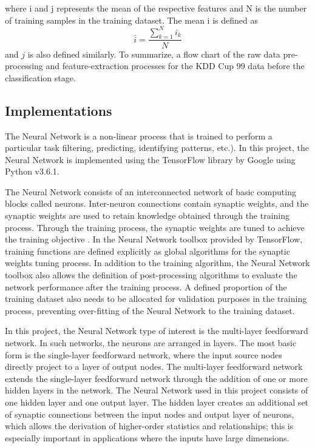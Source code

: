 \documentclass[12pt]{article}
\theoremstyle{definition}
\begin{document}
			where i and j represents the mean of the respective features and N is the number of training samples in the training dataset. The mean i is defined as
			\begin{equation}
				\bar{i} = \frac{\sum_{k=1}^{N}i_{k}}{N}
			\end{equation}
			and $j$ is also defined similarly. To summarize, a flow chart of the raw data pre-processing and feature-extraction processes for the KDD Cup 99 data before the classification stage.
			
		\subsection{Implementations}
			
			The Neural Network is a non-linear process that is trained to perform a particular task filtering, predicting, identifying patterns, etc.). In this project, the Neural Network is implemented using the TensorFlow library by Google using Python v3.6.1.
			
			
			The Neural Network consists of an interconnected network of basic computing blocks called
			neurons. Inter-neuron connections contain synaptic weights, and the synaptic weights are
			used to retain knowledge obtained through the training process. Through the training
			process, the synaptic weights are tuned to achieve the training objective \cite{Wang2010}. In the Neural Network
			toolbox provided by TensorFlow, training functions are defined explicitly as global
			algorithms for the synaptic weights tuning process. In addition to the training algorithm,
			the Neural Network toolbox also allows the definition of post-processing algorithms to evaluate the
			network performance after the training process. A defined proportion of the training
			dataset also needs to be allocated for validation purposes in the training process,
			preventing over-fitting of the Neural Network to the training dataset.
			
			In this project, the Neural Network type of interest is the multi-layer feedforward network. In such networks, the neurons are arranged in layers. The most basic form is the single-layer feedforward network, where the input source nodes directly project to a layer of output nodes. The multi-layer feedforward network extends the single-layer feedforward network through the addition of one or more hidden layers in the network. The Neural Network used in this project consists of one hidden layer and one output layer. The hidden layer creates an additional set of synaptic connections between the input nodes and output layer of neurons, which allows the derivation of higher-order statistics and relationships; this is especially important in applications where the inputs have large dimensions.
			
\end{document}
